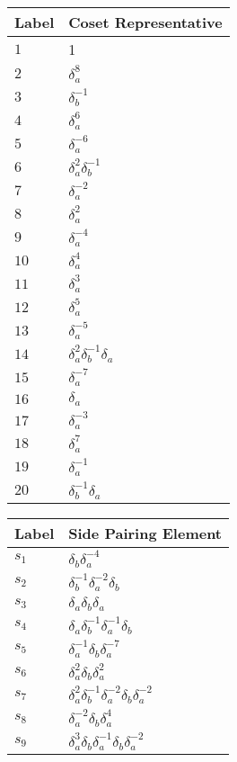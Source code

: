 \documentclass{article}
\begin{document}
\begin{center}
\begin{tabular}{ll}
\toprule
Label & Coset Representative\\
\midrule
$1$ & 1 \\
$2$ & $\delta_a^{8}$ \\
$3$ & $\delta_b^{-1}$ \\
$4$ & $\delta_a^{6}$ \\
$5$ & $\delta_a^{-6}$ \\
$6$ & $\delta_a^{2}\delta_b^{-1}$ \\
$7$ & $\delta_a^{-2}$ \\
$8$ & $\delta_a^{2}$ \\
$9$ & $\delta_a^{-4}$ \\
$10$ & $\delta_a^{4}$ \\
$11$ & $\delta_a^{3}$ \\
$12$ & $\delta_a^{5}$ \\
$13$ & $\delta_a^{-5}$ \\
$14$ & $\delta_a^{2}\delta_b^{-1}\delta_a^{}$ \\
$15$ & $\delta_a^{-7}$ \\
$16$ & $\delta_a^{}$ \\
$17$ & $\delta_a^{-3}$ \\
$18$ & $\delta_a^{7}$ \\
$19$ & $\delta_a^{-1}$ \\
$20$ & $\delta_b^{-1}\delta_a^{}$ \\
\bottomrule
\end{tabular}
\hfill
\begin{tabular}{ll}
\toprule
Label & Side Pairing Element\\
\midrule
$s_{1}$ & $\delta_b^{}\delta_a^{-4}$ \\
$s_{2}$ & $\delta_b^{-1}\delta_a^{-2}\delta_b^{}$ \\
$s_{3}$ & $\delta_a^{}\delta_b^{}\delta_a^{}$ \\
$s_{4}$ & $\delta_a^{}\delta_b^{-1}\delta_a^{-1}\delta_b^{}$ \\
$s_{5}$ & $\delta_a^{-1}\delta_b^{}\delta_a^{-7}$ \\
$s_{6}$ & $\delta_a^{2}\delta_b^{}\delta_a^{2}$ \\
$s_{7}$ & $\delta_a^{2}\delta_b^{-1}\delta_a^{-2}\delta_b^{}\delta_a^{-2}$ \\
$s_{8}$ & $\delta_a^{-2}\delta_b^{}\delta_a^{4}$ \\
$s_{9}$ & $\delta_a^{3}\delta_b^{}\delta_a^{-1}\delta_b^{}\delta_a^{-2}$ \\

\end{tabular}
\end{center}
\end{document}
